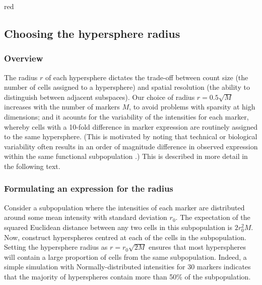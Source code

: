 \documentclass{article}
\begin{document}
\begin{color}{red}
\subsection{Choosing the hypersphere radius}

\subsubsection{Overview}
The radius $r$ of each hypersphere dictates the trade-off between count size (the number of cells assigned to a hypersphere) and spatial resolution (the ability to distinguish between adjacent subspaces).
Our choice of radius $r=0.5\sqrt{M}$ increases with the number of markers $M$, to avoid problems with sparsity at high dimensions; and it acounts for the variability of the intensities for each marker, whereby cells with a 10-fold difference in marker expression are routinely assigned to the same hypersphere.
(This is motivated by noting that technical or biological variability often results in an order of magnitude difference in observed expression within the same functional subpopulation \cite{zunder2015palladium, ornatsky2008study,zunder2015continuous}.)
This is described in more detail in the following text.
\end{color}

\subsubsection{Formulating an expression for the radius}
Consider a subpopulation where the intensities of each marker are distributed around some mean intensity with standard deviation $r_0$.
The expectation of the squared Euclidean distance between any two cells in this subpopulation is $2r_0^2M$.
Now, construct hyperspheres centred at each of the cells in the subpopulation.
Setting the hypersphere radius as $r=r_0\sqrt{2M}$ ensures that most hyperspheres will contain a large proportion of cells from the same subpopulation.
Indeed, a simple simulation with Normally-distributed intensities for 30 markers indicates that the majority of hyperspheres contain more than 50\% of the subpopulation.

\end{document}

